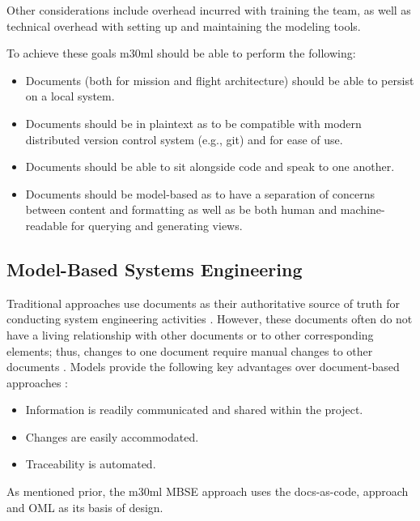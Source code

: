 \documentclass[conf]{new-aiaa}
\begin{document}
Other considerations include overhead incurred with training the team, as well as technical overhead with setting up and maintaining the modeling tools.

To achieve these goals m30ml should be able to perform the following:

\begin{itemize}
    \item Documents (both for mission and flight architecture) should be able to persist on a local system.
    
    \item Documents should be in plaintext as to be compatible with modern distributed version control system (e.g., git) and for ease of use.
    
    \item Documents should be able to sit alongside code and speak to one another.
    
    \item Documents should be model-based as to have a separation of concerns between content and formatting as well as be both human and machine-readable for querying and generating views.
\end{itemize}

\subsection{Model-Based Systems Engineering}

Traditional approaches use documents as their authoritative source of truth for conducting system engineering activities \cite{architecting_spacecraft}.  However, these documents often do not have a living relationship with other documents or to other corresponding elements; thus, changes to one document require manual changes to other documents \cite{ibm_mbse}.  Models provide the following key advantages over document-based approaches \cite{ibm_mbse}:

\begin{itemize}
    \item Information is readily communicated and shared within the project.
    
    \item Changes are easily accommodated.
    
    \item Traceability is automated.
\end{itemize}

As mentioned prior, the m30ml MBSE approach uses the docs-as-code, approach and OML as its basis of design.
\end{document}
